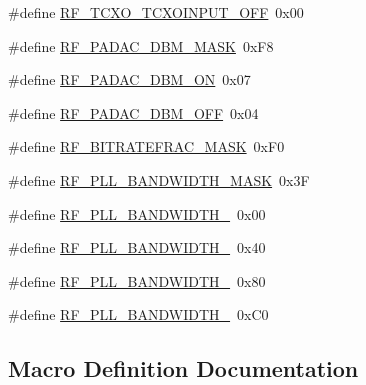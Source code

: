 \begin{DoxyCompactItemize}
\item 
\#define \mbox{\hyperlink{sx1276_regs-_fsk_8h_a120ffcbc3af395153eacc2b979c9e682}{R\+F\+\_\+\+T\+C\+X\+O\+\_\+\+T\+C\+X\+O\+I\+N\+P\+U\+T\+\_\+\+O\+FF}}~0x00
\item 
\#define \mbox{\hyperlink{sx1276_regs-_fsk_8h_a9169e38a9e608f0dc7fd94af67d8a2e6}{R\+F\+\_\+\+P\+A\+D\+A\+C\+\_\+D\+B\+M\+\_\+\+M\+A\+SK}}~0x\+F8
\item 
\#define \mbox{\hyperlink{sx1276_regs-_fsk_8h_ad3f69e485ca56bb333524e2be1687363}{R\+F\+\_\+\+P\+A\+D\+A\+C\+\_\+D\+B\+M\+\_\+\+ON}}~0x07
\item 
\#define \mbox{\hyperlink{sx1276_regs-_fsk_8h_a2e97c98b3d6f8ae20dc9241ef5b346d7}{R\+F\+\_\+\+P\+A\+D\+A\+C\+\_\+D\+B\+M\+\_\+\+O\+FF}}~0x04
\item 
\#define \mbox{\hyperlink{sx1276_regs-_fsk_8h_a15a3a7765ab924197cdf57cbe3fc1160}{R\+F\+\_\+\+B\+I\+T\+R\+A\+T\+E\+F\+R\+A\+C\+\_\+\+M\+A\+SK}}~0x\+F0
\item 
\#define \mbox{\hyperlink{sx1276_regs-_fsk_8h_aac01efdf312f6264cbd8b48d6c94e0ea}{R\+F\+\_\+\+P\+L\+L\+\_\+\+B\+A\+N\+D\+W\+I\+D\+T\+H\+\_\+\+M\+A\+SK}}~0x3F
\item 
\#define \mbox{\hyperlink{sx1276_regs-_fsk_8h_afdfab4acc3525e87ce252cbf593c3255}{R\+F\+\_\+\+P\+L\+L\+\_\+\+B\+A\+N\+D\+W\+I\+D\+T\+H\+\_}}~0x00
\item 
\#define \mbox{\hyperlink{sx1276_regs-_fsk_8h_acb5d72344cac01094235aaf62ac05399}{R\+F\+\_\+\+P\+L\+L\+\_\+\+B\+A\+N\+D\+W\+I\+D\+T\+H\+\_}}~0x40
\item 
\#define \mbox{\hyperlink{sx1276_regs-_fsk_8h_aa5f41821cba4e1c23b0cf8b6eb05d021}{R\+F\+\_\+\+P\+L\+L\+\_\+\+B\+A\+N\+D\+W\+I\+D\+T\+H\+\_}}~0x80
\item 
\#define \mbox{\hyperlink{sx1276_regs-_fsk_8h_ae1e12342489e52885c9de6812079d6e8}{R\+F\+\_\+\+P\+L\+L\+\_\+\+B\+A\+N\+D\+W\+I\+D\+T\+H\+\_}}~0x\+C0
\end{DoxyCompactItemize}


\subsection{Macro Definition Documentation}
\mbox{\label{sx1276_regs-_fsk_8h_aa4a7b5b5d63e9f8ef8f8dc4d7984753c}} 
